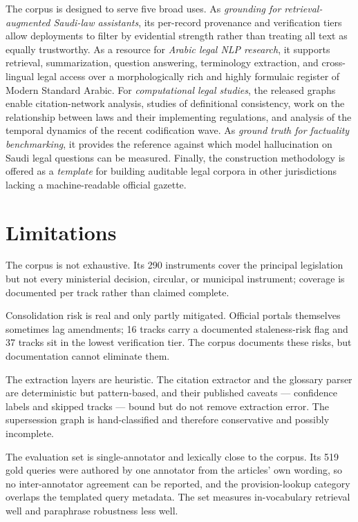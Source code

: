 \documentclass[sn-basic]{sn-jnl}%
\begin{document}
The corpus is designed to serve five broad uses. As \emph{grounding for
retrieval-augmented Saudi-law assistants}, its per-record provenance and
verification tiers allow deployments to filter by evidential strength rather
than treating all text as equally trustworthy. As a resource for
\emph{Arabic legal NLP research}, it supports retrieval, summarization,
question answering, terminology extraction, and cross-lingual legal access
over a morphologically rich and highly formulaic register of Modern Standard
Arabic. For \emph{computational legal studies}, the released graphs enable
citation-network analysis, studies of definitional consistency, work on the
relationship between laws and their implementing regulations, and analysis
of the temporal dynamics of the recent codification wave. As
\emph{ground truth for factuality benchmarking}, it provides the reference
against which model hallucination on Saudi legal questions can be measured.
Finally, the construction methodology is offered as a \emph{template} for
building auditable legal corpora in other jurisdictions lacking a
machine-readable official gazette.

\section{Limitations}
\label{sec:limitations}

The corpus is not exhaustive. Its 290 instruments cover the principal
legislation but not every ministerial decision, circular, or municipal
instrument; coverage is documented per track rather than claimed complete.

Consolidation risk is real and only partly mitigated. Official portals
themselves sometimes lag amendments; 16 tracks carry a documented
staleness-risk flag and 37 tracks sit in the lowest verification tier. The
corpus documents these risks, but documentation cannot eliminate them.

The extraction layers are heuristic. The citation extractor and the glossary
parser are deterministic but pattern-based, and their published caveats ---
confidence labels and skipped tracks --- bound but do not remove extraction
error. The supersession graph is hand-classified and therefore conservative
and possibly incomplete.

The evaluation set is single-annotator and lexically close to the corpus. Its
519 gold queries were authored by one annotator from the articles' own
wording, so no inter-annotator agreement can be reported, and the
provision-lookup category overlaps the templated query metadata. The set
measures in-vocabulary retrieval well and paraphrase robustness less well.
\end{document}
